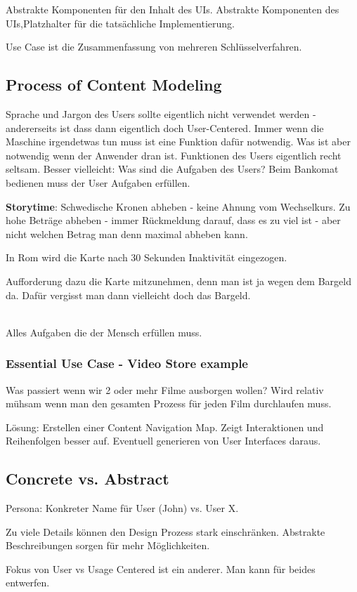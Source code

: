 Abstrakte Komponenten für den Inhalt des UIs. Abstrakte Komponenten des UIs,Platzhalter für die tatsächliche Implementierung. 

Use Case ist die Zusammenfassung von mehreren Schlüsselverfahren.

\subsection{Process of Content Modeling}
Sprache und Jargon des Users sollte eigentlich nicht verwendet werden - andererseits ist dass dann eigentlich doch User-Centered.
Immer wenn die Maschine irgendetwas tun muss ist eine Funktion dafür notwendig.
Was ist aber notwendig wenn der Anwender dran ist. Funktionen des Users eigentlich
recht seltsam. Besser vielleicht: Was sind die Aufgaben des Users?
Beim Bankomat bedienen muss der User Aufgaben erfüllen.
\parbox{\textwidth}{%
\textbf{Storytime}: Schwedische Kronen abheben - keine Ahnung vom Wechselkurs.
Zu hohe Beträge abheben - immer Rückmeldung darauf, dass es zu viel ist - aber nicht
welchen Betrag man denn maximal abheben kann.

In Rom wird die Karte nach 30 Sekunden Inaktivität eingezogen.

Aufforderung dazu die Karte mitzunehmen, denn man ist ja wegen dem Bargeld da.
Dafür vergisst man dann vielleicht doch das Bargeld. 
}%
\\
Alles Aufgaben die der Mensch erfüllen muss. 

\subsubsection{Essential Use Case - Video Store example}
Was passiert wenn wir 2 oder mehr Filme ausborgen wollen? Wird relativ mühsam
wenn man den gesamten Prozess für jeden Film durchlaufen muss. 

Lösung: Erstellen einer Content Navigation Map. Zeigt Interaktionen und Reihenfolgen
besser auf. Eventuell generieren von User Interfaces daraus.


\subsection{Concrete vs. Abstract}
Persona: Konkreter Name für User (John) vs. User X. 

Zu viele Details können den Design Prozess stark einschränken. 
Abstrakte Beschreibungen sorgen für mehr Möglichkeiten.

Fokus von User vs Usage Centered ist ein anderer. Man kann für beides entwerfen.
